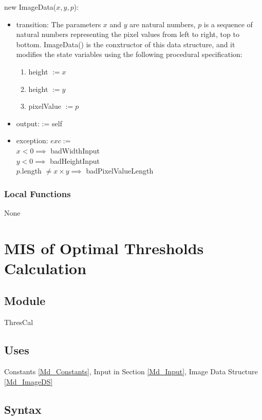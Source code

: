 \documentclass[12pt, titlepage]{article}
\begin{document}
\noindent new ImageData($x, y, p$):
\begin{itemize}
\item transition: 
The parameters $x$ and $y$ are natural numbers, $p$ is a sequence of natural
numbers representing the pixel values from left to right, top to bottom.
ImageData() is the conxtructor of this data structure, and it modifies
the state variables using the following procedural specification:
\begin{enumerate}
    \item
    height $:= x$
    \item
    height $:= y$
    \item
    pixelValue $:= p$
\end{enumerate}
\item output: := self
\item exception: $exc :=$\\
$x < 0 \implies$ badWidthInput\\
$y < 0 \implies$ badHeightInput\\
$p.$length $\not= x \times y \implies$ badPixelValueLength
\end{itemize}

\subsubsection{Local Functions}
None

\newpage

\section{MIS of Optimal Thresholds Calculation} \label{Md_Calculation}

\subsection{Module}

ThresCal

\subsection{Uses}

Constants \ref{Md_Constants}, Input in Section \ref{Md_Input}, Image Data
Structure \ref{Md_ImageDS}

\subsection{Syntax}
\end{document}
